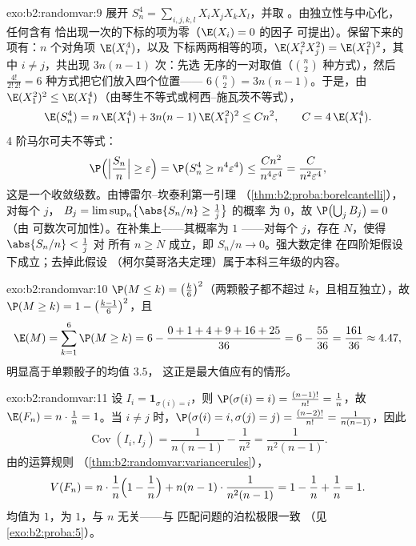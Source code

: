 \begin{solution}{exo:b2:randomvar:9}
展开 $S_n^4 = \sum_{i,j,k,l}X_iX_jX_kX_l$，并取
。由独立性与中心化，任何含有
恰出现一次的下标的项为零（$\E(X_i) = 0$ 的因子
可提出）。保留下来的项有：$n$ 个对角项 $\E(X_i^4)$，以及
下标两两相等的项，$\E(X_i^2X_j^2) =
\E(X_1^2)^2$，其中 $i \neq j$，共出现 $3n(n-1)$ 次：先选
无序的一对取值（$\binom n2$ 种方式），然后
$\frac{4!}{2!\,2!} = 6$ 种方式把它们放入四个位置——
$6\binom n2 = 3n(n-1)$。于是，由 $\E(X_1^2)^2
\leq \E(X_1^4)$（由琴生不等式或柯西–施瓦茨不等式），
\[
\E(S_n^4) = n\,\E(X_1^4) + 3n(n-1)\,\E(X_1^2)^2
\leq C n^2,
\qquad C = 4\,\E(X_1^4) .
\]
4 阶马尔可夫不等式：
\[
\P\Bigl(\Bigl|\frac{S_n}{n}\Bigr| \geq \varepsilon\Bigr)
= \P\bigl(S_n^4 \geq n^4\varepsilon^4\bigr)
\leq \frac{Cn^2}{n^4\varepsilon^4}
= \frac{C}{n^2\varepsilon^4} ,
\]
这是一个收敛级数。由博雷尔–坎泰利第一引理
（\cref{thm:b2:proba:borelcantelli}），对每个 $j$，
$B_j = \limsup_n\bigl\{\abs{S_n/n} \geq \frac1j\bigr\}$ 的概率
为 $0$，故 $\P\bigl(\bigcup_j B_j\bigr) = 0$（由
可数次可加性）。在补集上——其概率为 $1$
——对每个 $j$，存在 $N$，使得 $\abs{S_n/n} < \frac1j$ 对
所有 $n \geq N$ 成立，即 $S_n/n \to 0$。强大数定律
在四阶矩假设下成立；去掉此假设
（柯尔莫哥洛夫定理）属于本科三年级的内容。
\end{solution}

\begin{solution}{exo:b2:randomvar:10}
$\P(M \leq k) = \bigl(\frac k6\bigr)^2$（两颗骰子都不超过
$k$，且相互独立），故 $\P(M \geq k) = 1 -
\bigl(\frac{k-1}6\bigr)^2$，且
\[
\E(M) = \sum_{k=1}^6\P(M \geq k)
= 6 - \frac{0 + 1 + 4 + 9 + 16 + 25}{36}
= 6 - \frac{55}{36} = \frac{161}{36} \approx 4.47 ,
\]
明显高于单颗骰子的均值 $3.5$，
这正是最大值应有的情形。
\end{solution}

\begin{solution}{exo:b2:randomvar:11}
设 $I_i = \mathbf 1_{\sigma(i) = i}$，则 $\P(\sigma(i) = i) =
\frac{(n-1)!}{n!} = \frac1n$，故 $\E(F_n) = n\cdot\frac1n =
1$。当 $i \neq j$ 时，$\P(\sigma(i) = i, \sigma(j) = j) =
\frac{(n-2)!}{n!} = \frac1{n(n-1)}$，因此
\[
\operatorname{Cov}(I_i, I_j) = \frac1{n(n-1)} - \frac1{n^2}
= \frac{1}{n^2(n-1)} .
\]
由的运算规则
（\cref{thm:b2:randomvar:variancerules}），
\[
V(F_n) = n\cdot\frac1n\Bigl(1 - \frac1n\Bigr)
+ n(n-1)\cdot\frac1{n^2(n-1)}
= 1 - \frac1n + \frac1n = 1 .
\]
均值为 $1$，为 $1$，与 $n$ 无关——与
匹配问题的泊松极限一致
（见\cref{exo:b2:proba:5}）。
\end{solution}

